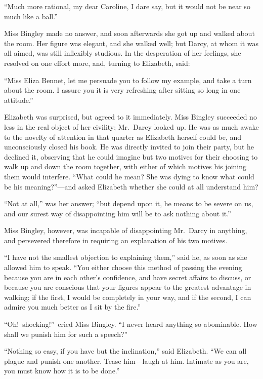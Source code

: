 \documentclass[12pt,english]{book}
\begin{document}
{}``Much more rational, my dear Caroline, I dare say, but it would
not be near so much like a ball.''

Miss Bingley made no answer, and soon afterwards she got up and walked
about the room. Her figure was elegant, and she walked well; but Darcy,
at whom it was all aimed, was still inflexibly studious. In the desperation
of her feelings, she resolved on one effort more, and, turning to
Elizabeth, said:

{}``Miss Eliza Bennet, let me persuade you to follow my example,
and take a turn about the room. I assure you it is very refreshing
after sitting so long in one attitude.''

Elizabeth was surprised, but agreed to it immediately. Miss Bingley
succeeded no less in the real object of her civility; Mr.\ Darcy
looked up. He was as much awake to the novelty of attention in that
quarter as Elizabeth herself could be, and unconsciously closed his
book. He was directly invited to join their party, but he declined
it, observing that he could imagine but two motives for their choosing
to walk up and down the room together, with either of which motives
his joining them would interfere. {}``What could he mean? She was
dying to know what could be his meaning?''---and asked Elizabeth
whether she could at all understand him?

{}``Not at all,'' was her answer; {}``but depend upon it, he means
to be severe on us, and our surest way of disappointing him will be
to ask nothing about it.''

Miss Bingley, however, was incapable of disappointing Mr.\ Darcy
in anything, and persevered therefore in requiring an explanation
of his two motives.

{}``I have not the smallest objection to explaining them,'' said
he, as soon as she allowed him to speak. {}``You either choose this
method of passing the evening because you are in each other's confidence,
and have secret affairs to discuss, or because you are conscious that
your figures appear to the greatest advantage in walking; if the first,
I would be completely in your way, and if the second, I can admire
you much better as I sit by the fire.''

{}``Oh!\ shocking!''\ cried Miss Bingley. {}``I never heard anything
so abominable. How shall we punish him for such a speech?''\ 

{}``Nothing so easy, if you have but the inclination,'' said Elizabeth.
{}``We can all plague and punish one another. Tease him\mbox{---}laugh
at him. Intimate as you are, you must know how it is to be done.''
\end{document}
